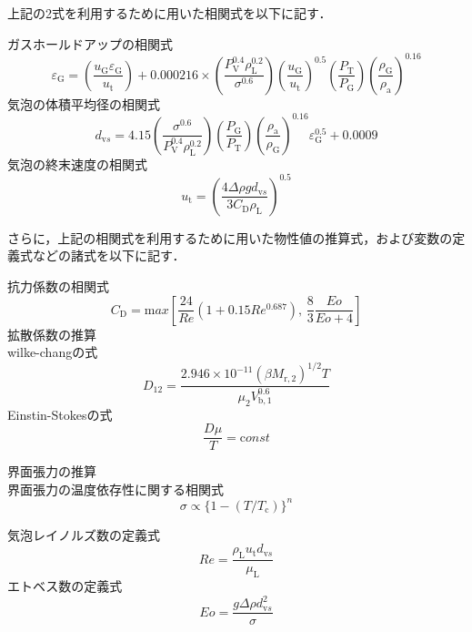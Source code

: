 \documentclass[a4j, titlepage]{jsarticle}
\begin{document}
上記の2式を利用するために用いた相関式を以下に記す．

ガスホールドアップの相関式
\begin{equation}
    \varepsilon_{{\mathrm G}} = \left( \frac{u_{{\mathrm G}}\varepsilon_{{\mathrm G}}}{u_{{\mathrm t}}} \right) + 0.000216 \times \left( \frac{P_{{\mathrm V}}^{0.4} \rho_{{\mathrm L}}^{0.2} }{ \sigma^{0.6}} \right) \left( \frac{u_{{\mathrm G}}}{u_{{\mathrm t}}} \right)^{0.5} \left( \frac{P_{{\mathrm T}}}{P_{{\mathrm G}}} \right) \left( \frac{\rho_{{\mathrm G}}}{\rho_{{\mathrm a}}} \right)^{0.16}
\end{equation}
気泡の体積平均径の相関式
\begin{equation}
    d_{{\mathrm vs}} = 4.15 \left( \frac{\sigma^{0.6}}{P_{{\mathrm V}}^{0.4} \rho_{{\mathrm L}}^{0.2}} \right) \left( \frac{P_{{\mathrm G}}}{P_{{\mathrm T}}} \right) \left( \frac{\rho_{{\mathrm a}}}{\rho_{{\mathrm G}}} \right) ^{0.16} \varepsilon_{{\mathrm G}}^{0.5} + 0.0009
\end{equation}
気泡の終末速度の相関式
\begin{equation}
    u_{{\mathrm t}} = \left( \frac{4\Delta \rho g d_{{\mathrm vs}}}{3C_{{\mathrm D}}\rho_{{\mathrm L}}} \right)^{0.5}
\end{equation}

さらに，上記の相関式を利用するために用いた物性値の推算式，および変数の定義式などの諸式を以下に記す．

抗力係数の相関式
\begin{equation}
    C_{{\mathrm D}} = {\mathrm max} \left[ \frac{24}{Re}(1+0.15Re^{0.687}), \, \frac{8}{3}\frac{Eo}{Eo+4} \right]
\end{equation}
拡散係数の推算\\
wilke-changの式
\begin{equation}
    D_{12} = \frac{2.946\times 10^{-11}(\beta M_{{\mathrm r,2}})^{1/2} T} {\mu_2 V_{{\mathrm b,1}}^{0.6}}
\end{equation}
Einstin-Stokesの式
\begin{equation}
    \frac{D \mu}{T} = {\mathrm const}
\end{equation}

界面張力の推算\\
界面張力の温度依存性に関する相関式
\begin{equation}
    \sigma \propto \{1-(T/T_{{\mathrm c}}) \}^n
\end{equation}

気泡レイノルズ数の定義式
\begin{equation}
    Re = \frac{\rho_{{\mathrm L}}u_{{\mathrm t}}d_{{\mathrm vs}}}{\mu_{{\mathrm L}}}
\end{equation}
エトベス数の定義式
\begin{equation}
    Eo = \frac{g \Delta \rho d_{{\mathrm vs}}^2}{\sigma}
\end{equation}
\end{document}
